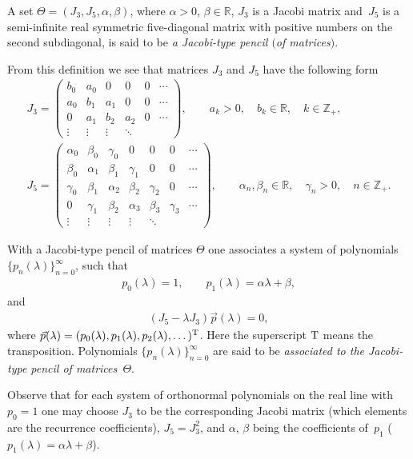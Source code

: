 \documentclass[pdftex]{sigma}
\numberwithin{equation}{section}
\begin{document}
\begin{Definition}\label{d1_1}A set $\Theta = (J_3, J_5, \alpha, \beta)$, where $\alpha>0$, $\beta\in\mathbb{R}$, $J_3$ is a Jacobi matrix and~$J_5$ is a semi-inf\/inite real symmetric f\/ive-diagonal matrix with positive numbers on the second subdiagonal, is said to be \textit{a Jacobi-type pencil $($of matrices$)$}.
\end{Definition}
From this def\/inition we see that matrices $J_3$ and $J_5$ have the following form
\begin{gather}
J_3 =
\left(
\begin{matrix}
b_0 & a_0 & 0 & 0 & 0 & \cdots\\
a_0 & b_1 & a_1 & 0 & 0 & \cdots\\
0 & a_1 & b_2 & a_2 & 0 &\cdots\\
\vdots & \vdots & \vdots & \ddots \end{matrix}
\right),\qquad a_k>0,\quad b_k\in\mathbb{R},\quad k\in\mathbb{Z}_+, \label{f1_5} \\
J_5 = \left(
\begin{matrix}
\alpha_0 & \beta_0 & \gamma_0 & 0 & 0 & 0 & \cdots\\
\beta_0 & \alpha_1 & \beta_1 & \gamma_1 & 0 & 0 & \cdots\\
\gamma_0 & \beta_1 & \alpha_2 & \beta_2 & \gamma_2 & 0 & \cdots\\
0 & \gamma_1 & \beta_2 & \alpha_3 & \beta_3 & \gamma_3 & \cdots \\
\vdots & \vdots & \vdots &\vdots & \ddots \end{matrix}
\right),\qquad \alpha_n,\beta_n\in\mathbb{R},\quad \gamma_n>0,\quad n\in\mathbb{Z}_+. \label{f1_10}
\end{gather}

With a Jacobi-type pencil of matrices $\Theta$ one associates a system of polynomials $\{ p_n(\lambda) \}_{n=0}^\infty$, such that
\begin{gather*} p_0(\lambda) = 1,\qquad p_1(\lambda) = \alpha\lambda + \beta, \end{gather*}
and
\begin{gather}\label{f1_20}
(J_5 - \lambda J_3) \vec p(\lambda) = 0,
\end{gather}
where $\vec p(\lambda) = (p_0(\lambda), p_1(\lambda), p_2(\lambda),\dots)^{\rm T}$. Here the superscript ${\rm T}$ means the transposition. Polynomials $\{ p_n(\lambda) \}_{n=0}^\infty$ are said to be \textit{associated to the Jacobi-type pencil of matrices~$\Theta$}.

Observe that for each system of orthonormal polynomials on the real line with $p_0=1$ one may choose $J_3$ to be the corresponding Jacobi matrix (which elements are the recurrence coef\/f\/icients), $J_5 = J_3^2$, and $\alpha$, $\beta$ being the coef\/f\/icients of~$p_1$ ($p_1(\lambda) = \alpha\lambda + \beta$).
\end{document}
